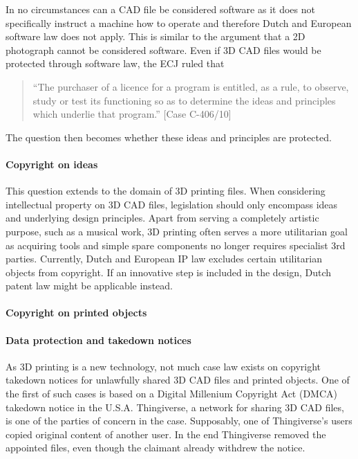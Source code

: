 In no circumstances can a CAD file be considered software as it does not 
specifically instruct a machine how to operate and therefore Dutch and European 
software law does not apply.
This is similar to the argument that a 2D photograph cannot be considered 
software.
Even if 3D CAD files would be protected through software law, the ECJ ruled 
that 
\begin{quote}``The purchaser of a licence for a program is entitled, as a rule, to 
observe, study or test its functioning so as to determine the ideas and 
principles which underlie that program.'' [Case C-406/10]\end{quote}
The question then becomes whether these ideas and principles are protected.

\paragraph{Copyright on ideas}
This question extends to the domain of 3D printing files.
When considering intellectual property on 3D CAD files, legislation should only 
encompass ideas and underlying design principles.
Apart from serving a completely artistic purpose, such as a musical work, 3D 
printing often serves a more utilitarian goal as acquiring tools and simple 
spare components no longer requires specialist 3rd parties.
Currently, Dutch and European IP law excludes certain utilitarian objects from 
copyright.
If an innovative step is included in the design, Dutch patent law might be 
applicable instead.

\paragraph{Copyright on printed objects}

\paragraph{Data protection and takedown notices}
As 3D printing is a new technology, not much case law exists on copyright 
takedown notices for unlawfully shared 3D CAD files and printed objects.
One of the first of such cases is based on a Digital Millenium Copyright Act 
(DMCA) takedown notice in the U.S.A.
Thingiverse, a network for sharing 3D CAD files, is one of the parties of 
concern in the case.
Supposably, one of Thingiverse's users copied original content of another user.
In the end Thingiverse removed the appointed files, even though the claimant
already withdrew the notice.

